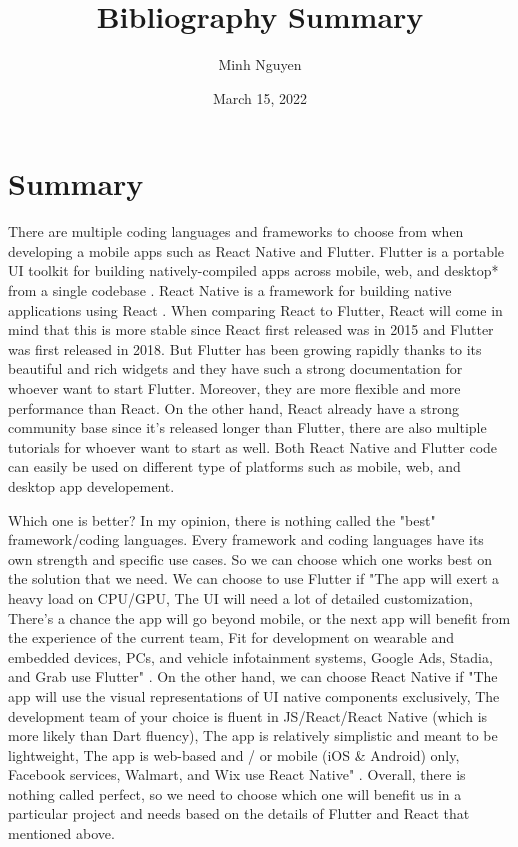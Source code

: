 \documentclass{article}
\title{Bibliography Summary}
\author{Minh Nguyen}
\date{March 15, 2022}
\begin{document}
\maketitle

\section*{Summary}
There are multiple coding languages and frameworks to choose from when developing a mobile apps such as React Native and Flutter. Flutter is a portable UI toolkit for building natively-compiled apps across mobile, web, and desktop* from a single codebase \cite{Bartosz21}. React Native is a framework for building native applications using React \cite{Bartosz21}. When comparing React to Flutter, React will come in mind that this is more stable since React first released was in 2015 and Flutter was first released in 2018. But Flutter has been growing rapidly thanks to its beautiful and rich widgets and they have such a strong documentation for whoever want to start Flutter. Moreover, they are more flexible and more performance than React. On the other hand, React already have a strong community base since it's released longer than Flutter, there are also multiple tutorials for whoever want to start as well. Both React Native and Flutter code can easily be used on different type of platforms such as mobile, web, and desktop app developement.

\medskip

Which one is better? In my opinion, there is nothing called the "best" framework/coding languages. Every framework and coding languages have its own strength and specific use cases. So we can choose which one works best on the solution that we need. We can choose to use Flutter if "The app will exert a heavy load on CPU/GPU, The UI will need a lot of detailed customization, There’s a chance the app will go beyond mobile, or the next app will benefit from the experience of the current team, Fit for development on wearable and embedded devices, PCs, and vehicle infotainment systems, Google Ads, Stadia, and Grab use Flutter" \cite{Serhii22}. On the other hand, we can choose React Native if "The app will use the visual representations of UI native components exclusively, The development team of your choice is fluent in JS/React/React Native (which is more likely than Dart fluency), The app is relatively simplistic and meant to be lightweight, The app is web-based and / or mobile (iOS & Android) only, Facebook services, Walmart, and Wix use React Native" \cite{Serhii22}. Overall, there is nothing called perfect, so we need to choose which one will benefit us in a particular project and needs based on the details of Flutter and React that mentioned above.


\printbibliography
\end{document}
